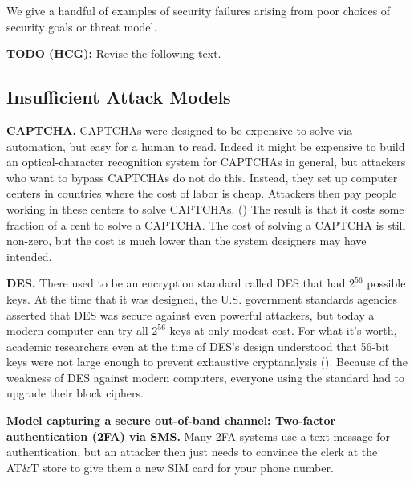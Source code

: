 \documentclass[
  letterpaper,
]{scrbook}
\newcommand{\todobox}[1]{{\color{todocolor}#1}}
\theoremstyle{definition}
\theoremstyle{plain}
\theoremstyle{plain}
\theoremstyle{remark}
\begin{document}
We give a handful of examples of security failures arising from poor
choices of security goals or threat model.

\todobox{\textbf{TODO (HCG):} Revise the following text.}

\subsection{Insufficient Attack
Models}\label{insufficient-attack-models}

\textbf{CAPTCHA.} CAPTCHAs were designed to be expensive to solve via
automation, but easy for a human to read. Indeed it might be expensive
to build an optical-character recognition system for CAPTCHAs in
general, but attackers who want to bypass CAPTCHAs do not do this.
Instead, they set up computer centers in countries where the cost of
labor is cheap. Attackers then pay people working in these centers to
solve CAPTCHAs. () The result is that it costs some fraction of a cent to solve a
CAPTCHA. The cost of solving a CAPTCHA is still non-zero, but the cost
is much lower than the system designers may have intended.

\textbf{DES.} There used to be an encryption standard called DES that
had \(2^{56}\) possible keys. At the time that it was designed, the U.S.
government standards agencies asserted that DES was secure against even
powerful attackers, but today a modern computer can try all \(2^{56}\)
keys at only modest cost. For what it's worth, academic researchers even
at the time of DES's design understood that 56-bit keys were not large
enough to prevent exhaustive cryptanalysis (). Because of the weakness of DES against modern
computers, everyone using the standard had to upgrade their block
ciphers.


\textbf{Model capturing a secure out-of-band channel: Two-factor
authentication (2FA) via SMS.} Many 2FA systems use a text message for
authentication, but an attacker then just needs to convince the clerk at
the AT\&T store to give them a new SIM card for your phone number.
\end{document}
